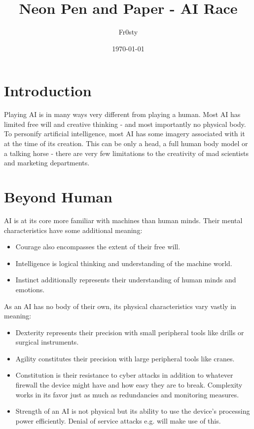 \documentclass[12pt,a4paper]{book}
\title{Neon Pen and Paper - AI Race}
\author{Fr0sty}
\date{\today}
\begin{document}
	\maketitle
	\tableofcontents
	
	\chapter{Introduction}
	Playing AI is in many ways very different from playing a human. Most AI has limited free will and creative thinking - and most importantly no physical body. To personify artificial intelligence, most AI has some imagery associated with it at the time of its creation. This can be only a head, a full human body model or a talking horse - there are very few limitations to the creativity of mad scientists and marketing departments.
	
	\chapter{Beyond Human}
	AI is at its core more familiar with machines than human minds. Their mental characteristics have some additional meaning:
	\begin{itemize}
		\item Courage also encompasses the extent of their free will.
		\item Intelligence is logical thinking and understanding of the machine world.
		\item Instinct additionally represents their understanding of human minds and emotions.
	\end{itemize}
	
	As an AI has no body of their own, its physical characteristics vary vastly in meaning:
	\begin{itemize}
		\item Dexterity represents their precision with small peripheral tools like drills or surgical instruments.
		\item Agility constitutes their precision with large peripheral tools like cranes.
		\item Constitution is their resistance to cyber attacks in addition to whatever firewall the device might have and how easy they are to break. Complexity works in its favor just as much as redundancies and monitoring measures.
		\item Strength of an AI is not physical but its ability to use the device’s processing power efficiently. Denial of service attacks e.g. will make use of this.
	\end{itemize}
	
\end{document}
